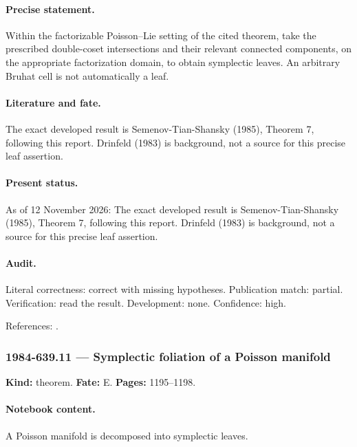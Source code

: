 \paragraph{Precise statement.} Within the factorizable Poisson--Lie setting of the cited theorem, take the prescribed double-coset intersections and their relevant connected components, on the appropriate factorization domain, to obtain symplectic leaves. An arbitrary Bruhat cell is not automatically a leaf.

\paragraph{Literature and fate.} The exact developed result is Semenov-Tian-Shansky (1985), Theorem 7, following this report. Drinfeld (1983) is background, not a source for this precise leaf assertion.

\paragraph{Present status.} As of 12 November 2026: The exact developed result is Semenov-Tian-Shansky (1985), Theorem 7, following this report. Drinfeld (1983) is background, not a source for this precise leaf assertion.

\paragraph{Audit.} Literal correctness: correct with missing hypotheses. Publication match: partial. Verification: read the result. Development: none. Confidence: high.

\noindent References: \citep{semenov1985dressing}.\par

\subsubsection{1984-639.11 --- Symplectic foliation of a Poisson manifold}

\label{item:1984-639.11}

\noindent\textbf{Kind:} theorem. \textbf{Fate:} E. \textbf{Pages:} 1195--1198.\par

\paragraph{Notebook content.} A Poisson manifold is decomposed into symplectic leaves.

